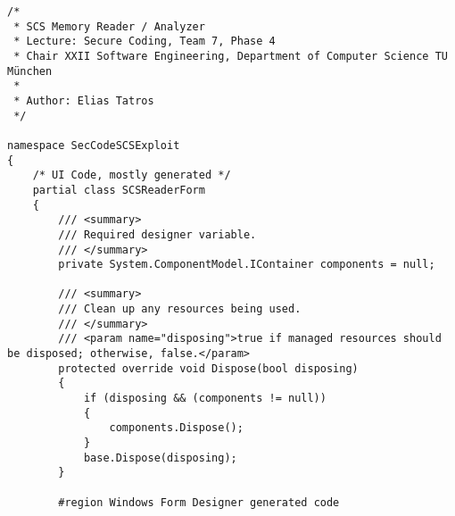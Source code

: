 \begin{lstlisting}
/* 
 * SCS Memory Reader / Analyzer
 * Lecture: Secure Coding, Team 7, Phase 4
 * Chair XXII Software Engineering, Department of Computer Science TU München
 *
 * Author: Elias Tatros
 */

namespace SecCodeSCSExploit
{
    /* UI Code, mostly generated */
    partial class SCSReaderForm
    {
        /// <summary>
        /// Required designer variable.
        /// </summary>
        private System.ComponentModel.IContainer components = null;

        /// <summary>
        /// Clean up any resources being used.
        /// </summary>
        /// <param name="disposing">true if managed resources should be disposed; otherwise, false.</param>
        protected override void Dispose(bool disposing)
        {
            if (disposing && (components != null))
            {
                components.Dispose();
            }
            base.Dispose(disposing);
        }

        #region Windows Form Designer generated code


\end{lstlisting}
